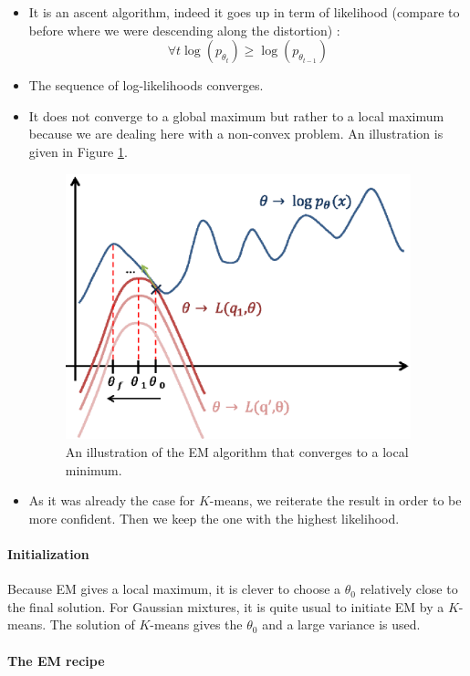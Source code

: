 \documentclass[12pt]{report}
\begin{document}
\begin{itemize}
\item It is an ascent algorithm, indeed it goes up in term of likelihood (compare to before where we were descending along the distortion) : $$\forall t
  \log(p_{\theta_t})\geq \log(p_{\theta_{t-1}})$$
\item The sequence of log-likelihoods converges.
\item It does not converge to a global maximum but rather to a local maximum because we are dealing here with a non-convex problem.   An illustration is given in Figure \ref{EMIllustration}.
\begin{figure}[ht]  
  \centering
  \includegraphics[width=10cm]{./figures/illustrationem.eps}
  \caption{\label{EMIllustration}An illustration of the EM algorithm that converges to a local minimum.}
\end{figure}
\item As it was already the case for $K$-means, we reiterate the result in order to be more confident. Then we keep the one with the highest likelihood.  
\end{itemize}

\paragraph{Initialization}

Because EM gives a local maximum, it is clever to choose a $\theta_0$ relatively close to the final solution. For Gaussian mixtures, it is quite usual to initiate EM by a $K$-means. The solution of $K$-means gives the $\theta_0$ and a large variance is used.

\newpage
\paragraph{The EM recipe}
\end{document}
